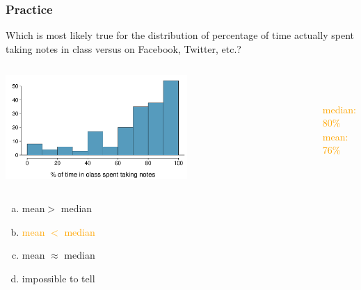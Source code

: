 \documentclass[notes,11pt, aspectratio=169]{beamer}
\newcommand{\pq}[1]{
\begin{beamerboxesrounded}[shadow = false, lower = prac ques body]{}
#1
\end{beamerboxesrounded}
}
\begin{document}
\begin{frame}
\frametitle{Practice}

\pq{{\small Which is most likely true for the distribution of percentage of time actually spent taking notes in class versus on Facebook, Twitter, etc.?}}

\vspace{-0.5cm}

\begin{columns}
\begin{center}
\includegraphics[width=0.6\textwidth]{graphs/l02f12.pdf}
\end{center}
$\:$ \\
$\:$ \\
\textcolor{orange}{median: 80\% \\ mean: 76\%}
\end{columns}

{\small
\begin{enumerate}[(a)]
\item mean$>$ median
\item \textcolor{orange}{mean $<$ median}
\item mean $\approx$ median
\item impossible to tell
\end{enumerate}
}

\end{frame}
\end{document}
